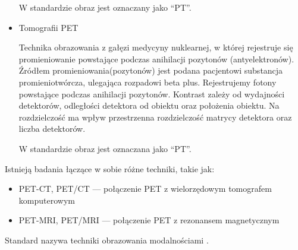 \begin{itemize}
          W standardzie \DICOM obraz jest oznaczany jako \enquote{PT}.

    \item Tomografii PET

          Technika obrazowania  z gałęzi medycyny nuklearnej, w której rejestruje się promieniowanie powstające podczas anihilacji pozytonów (antyelektronów).
          Źródłem promieniowania(pozytonów) jest podana pacjentowi substancja promieniotwórcza, ulegająca rozpadowi beta plus.
          Rejestrujemy fotony powstające podczas anihilacji pozytonów.
          Kontrast zależy od wydajności detektorów, odległości detektora od obiektu oraz położenia obiektu.
          Na rozdzielczość ma wpływ przestrzenna rozdzielczość matrycy detektora oraz liczba detektorów.

          W standardzie \DICOM obraz jest oznaczana jako \enquote{PT}.

\end{itemize}

Istnieją badania łączące w sobie różne techniki, takie jak:
\begin{itemize}
    \item PET-CT, PET/CT --- połączenie PET z wielorzędowym tomografem komputerowym
    \item PET-MRI, PET/MRI --- połączenie PET z rezonansem magnetycznym
\end{itemize}

Standard \DICOM nazywa techniki obrazowania modalnościami .